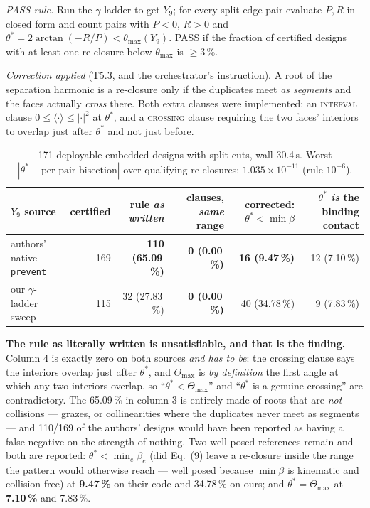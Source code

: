 \documentclass[10pt,a4paper]{article}
\begin{document}
\emph{PASS rule.} Run the $\gamma$ ladder to get $Y_9$; for every split-edge pair evaluate $P,R$
in closed form and count pairs with $P<0$, $R>0$ and $\theta^* = 2\arctan(-R/P) < \theta_{\max}(Y_9)$.
PASS if the fraction of certified designs with at least one re-closure below $\theta_{\max}$ is
$\ge3\,\%$.

\emph{Correction applied} (T5.3, and the orchestrator's instruction). A root of the separation
harmonic is a re-closure only if the duplicates meet \emph{as segments} and the faces actually
\emph{cross} there. Both extra clauses were implemented: an \textsc{interval} clause
$0\le\langle\cdot\rangle\le|\cdot|^2$ at $\theta^*$, and a \textsc{crossing} clause requiring the
two faces' interiors to overlap just after $\theta^*$ and not just before.

\begin{table}[h]\centering\footnotesize
\begin{tabular}{@{}p{28mm}rrrrr@{}}
\toprule
$Y_9$ source & certified & rule \emph{as written} & clauses, \emph{same} range & corrected: $\theta^*<\min\beta$ & $\theta^*$ \emph{is} the binding contact \\
\midrule
authors' native \texttt{prevent} & 169 & \textbf{110 (65.09\,\%)} & \textbf{0 (0.00\,\%)} & \textbf{16 (9.47\,\%)} & 12 (7.10\,\%) \\
our $\gamma$-ladder sweep & 115 & 32 (27.83\,\%) & \textbf{0 (0.00\,\%)} & 40 (34.78\,\%) & 9 (7.83\,\%) \\
\bottomrule
\end{tabular}
\caption{171 deployable embedded designs with split cuts, wall 30.4\,s. Worst
$|\theta^* - \text{per-pair bisection}|$ over qualifying re-closures: $1.035\times10^{-11}$
(rule $10^{-6}$).}
\end{table}

\textbf{The rule as literally written is unsatisfiable, and that is the finding.} Column 4 is
exactly zero on both sources \emph{and has to be}: the crossing clause says the interiors
overlap just after $\theta^*$, and $\Theta_{\max}$ is \emph{by definition} the first angle at
which any two interiors overlap, so ``$\theta^* < \Theta_{\max}$'' and ``$\theta^*$ is a genuine
crossing'' are contradictory. The 65.09\,\% in column 3 is entirely made of roots that are
\emph{not} collisions --- grazes, or collinearities where the duplicates never meet as segments
--- and 110/169 of the authors' designs would have been reported as having a false negative on
the strength of nothing. Two well-posed references remain and both are reported:
$\theta^* < \min_e\beta_e$ (did Eq.~(9) leave a re-closure inside the range the pattern would
otherwise reach --- well posed because $\min\beta$ is kinematic and collision-free) at
\textbf{9.47\,\%} on their code and 34.78\,\% on ours; and $\theta^* = \Theta_{\max}$ at
\textbf{7.10\,\%} and 7.83\,\%.
\end{document}
